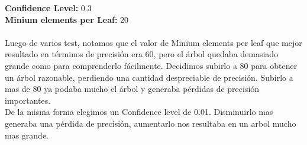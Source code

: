               \textbf{Confidence Level:} 0.3\\
              \textbf{Minium elements per Leaf:} 20\\\\

          Luego de varios test, notamos que el valor de Minium elements per leaf
          que mejor resultado en términos de precisión era 60, pero el árbol
          quedaba demasiado grande como para comprenderlo fácilmente. Decidimos
          subirlo a 80 para obtener un árbol razonable, perdiendo una cantidad
          despreciable de precisión. Subirlo a mas de 80 ya podaba mucho el
          árbol y generaba pérdidas de precisión importantes.\\
          De la misma forma elegimos un Confidence level de 0.01. Disminuirlo
          mas generaba una pérdida de precisión, aumentarlo nos resultaba en un
          arbol mucho mas grande.


